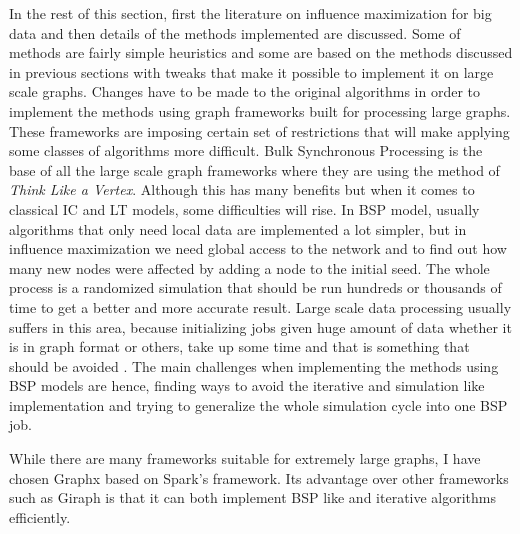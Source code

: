 \documentclass[english]{tktltiki}
\begin{document}
In the rest of this section, first the literature on influence maximization for big data and then details of the methods implemented are discussed. Some of methods are fairly simple heuristics and some are based on the methods discussed in previous sections with tweaks that make it possible to implement it on large scale graphs. Changes have to be made to the original algorithms in order to implement the methods using graph frameworks built for processing  large graphs. These frameworks are imposing certain set of restrictions that will make applying some classes of algorithms more difficult. Bulk Synchronous Processing is the base of all the large scale graph frameworks where they are using the method of \textit{Think Like a Vertex}. Although this has many benefits but when it comes to classical IC and LT models, some difficulties will rise. In BSP model, usually algorithms that only need local data are implemented a lot simpler, but in influence maximization we need global access to the network and to find out how many new nodes were affected by adding a node to the initial seed. The whole process is a randomized simulation that should be run hundreds or thousands of time to get a better and more accurate result. Large scale data processing usually suffers in this area, because initializing jobs given huge amount of data whether it is in graph format or others, take up some time and that is something that should be avoided . 
The main challenges when implementing the methods using BSP models are hence, finding ways to avoid the iterative and simulation like implementation and trying to generalize the whole simulation cycle into one BSP job.

While there are many frameworks suitable for extremely large graphs, I have chosen Graphx based on Spark's framework. Its advantage over other frameworks such as Giraph is that it can both implement BSP like and iterative algorithms efficiently. 
\end{document}
